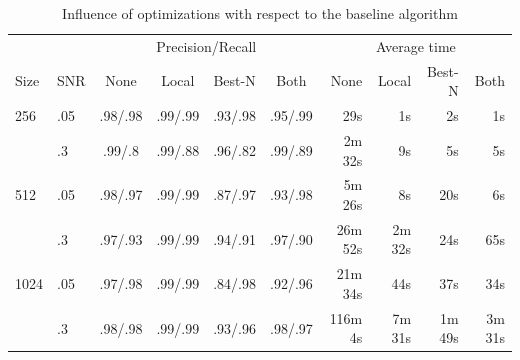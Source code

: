 \documentclass{llncs}
\begin{document}
\begin{table}[p]
\caption{Influence of optimizations with respect to the baseline algorithm}
\label{table:optimize}
\begin{tabular*}{\textwidth}{l @{\extracolsep{\fill}}lccccrrrr}
\toprule
 & & \multicolumn{4}{c}{Precision/Recall} & \multicolumn{4}{c}{Average time}\\
 \cmidrule(l){3-6} \cmidrule(l){7-10} 
 Size & SNR & None & Local & Best-N & Both & None & Local & Best-N & Both \\
\midrule
 256 & .05 & .98/.98 & .99/.99 & .93/.98 & .95/.99 & 29s & 1s & 2s & 1s \\
   & .3 &.99/.8 & .99/.88 & .96/.82 & .99/.89 & 2m 32s & 9s & 5s & 5s \\
 512 & .05 & .98/.97 & .99/.99 & .87/.97 & .93/.98 & 5m 26s & 8s & 20s & 6s \\
  & .3 &.97/.93 & .99/.99 & .94/.91 & .97/.90 & 26m 52s & 2m 32s & 24s & 65s \\
 1024 & .05 & .97/.98 & .99/.99 & .84/.98 & .92/.96 & 21m 34s & 44s & 37s & 34s \\
 & .3 &.98/.98 & .99/.99 & .93/.96 & .98/.97 & 116m 4s & 7m 31s & 1m 49s & 3m 31s \\
\bottomrule
\end{tabular*}
\end{table}
\end{document}

